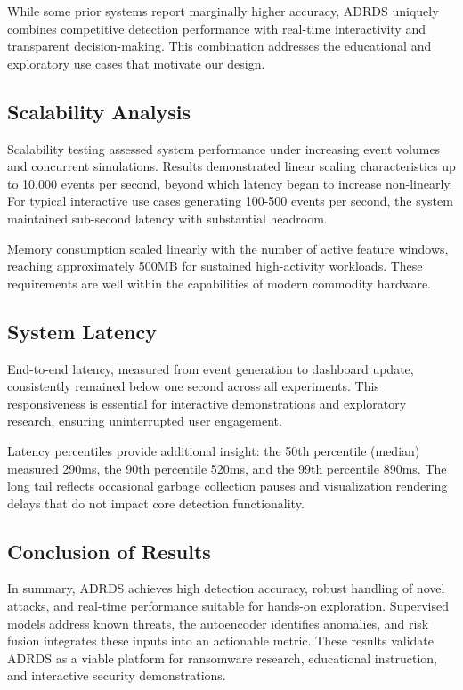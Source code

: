While some prior systems report marginally higher accuracy, ADRDS uniquely combines competitive detection performance with real-time interactivity and transparent decision-making. This combination addresses the educational and exploratory use cases that motivate our design.

\subsection{Scalability Analysis}

Scalability testing assessed system performance under increasing event volumes and concurrent simulations. Results demonstrated linear scaling characteristics up to 10,000 events per second, beyond which latency began to increase non-linearly. For typical interactive use cases generating 100-500 events per second, the system maintained sub-second latency with substantial headroom.

Memory consumption scaled linearly with the number of active feature windows, reaching approximately 500MB for sustained high-activity workloads. These requirements are well within the capabilities of modern commodity hardware.

\subsection{System Latency}

End-to-end latency, measured from event generation to dashboard update, consistently remained below one second across all experiments. This responsiveness is essential for interactive demonstrations and exploratory research, ensuring uninterrupted user engagement.

Latency percentiles provide additional insight: the 50th percentile (median) measured 290ms, the 90th percentile 520ms, and the 99th percentile 890ms. The long tail reflects occasional garbage collection pauses and visualization rendering delays that do not impact core detection functionality.

\subsection{Conclusion of Results}

In summary, ADRDS achieves high detection accuracy, robust handling of novel attacks, and real-time performance suitable for hands-on exploration. Supervised models address known threats, the autoencoder identifies anomalies, and risk fusion integrates these inputs into an actionable metric. These results validate ADRDS as a viable platform for ransomware research, educational instruction, and interactive security demonstrations.
